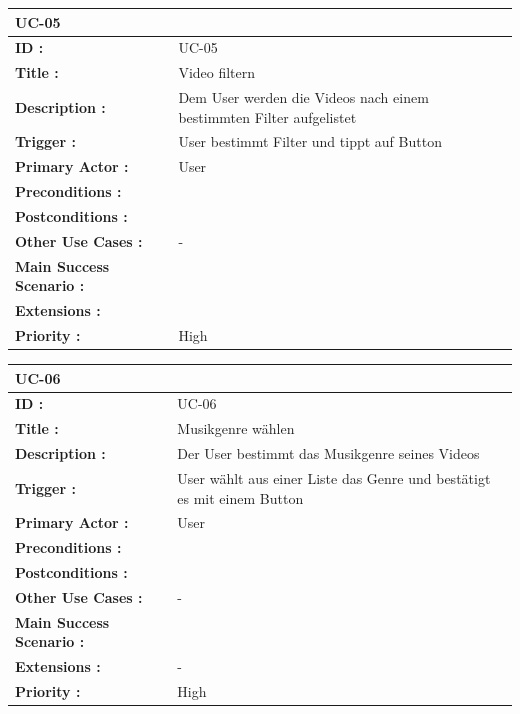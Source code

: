 	\begin{table}[H]
		\begin{tabular}{|p{8cm}|p{8cm}|}
			\hline
			\textbf{UC-05 } \\ 
			\hline
			\textbf{ID :}\centering & UC-05  \\ \hline 
			\textbf{Title :}\centering & Video filtern \\ \hline 
			\textbf{Description :}\centering & Dem User werden die Videos nach einem bestimmten Filter aufgelistet \\ \hline 
			\textbf{Trigger :}\centering & User bestimmt Filter und tippt auf Button \\ \hline 
			\textbf{Primary Actor :} \centering & User \\ \hline 
			\textbf{Preconditions :}\centering & 
			\\ \hline 
			\textbf{Postconditions :}\centering &
			\\ \hline
			\textbf{Other Use Cases :}\centering & - \\ \hline  
			\textbf{Main Success Scenario :}\centering &
			\\ \hline  
			\textbf{Extensions :}\centering &  \\ \hline  
			\textbf{Priority :}\centering & High \\ \hline  
		\end{tabular}
	\end{table}	
	
	\begin{table}[H]
		\begin{tabular}{|p{8cm}|p{8cm}|}
			\hline
			\textbf{UC-06 } \\ 
			\hline
			\textbf{ID :}\centering & UC-06  \\ \hline 
			\textbf{Title :}\centering & Musikgenre wählen \\ \hline 
			\textbf{Description :}\centering & Der User bestimmt das Musikgenre seines Videos \\ \hline 
			\textbf{Trigger :}\centering & User wählt aus einer Liste das Genre und bestätigt es mit einem Button \\ \hline 
			\textbf{Primary Actor :} \centering & User \\ \hline 
			\textbf{Preconditions :}\centering &\\ \hline 
			\textbf{Postconditions :}\centering	& 
			\\ \hline		
			\textbf{Other Use Cases :}\centering & - \\ \hline  
			\textbf{Main Success Scenario :}\centering &
			\\ \hline  
			\textbf{Extensions :}\centering & - \\ \hline  
			\textbf{Priority :}\centering & High \\ \hline  
		\end{tabular}
	\end{table}

